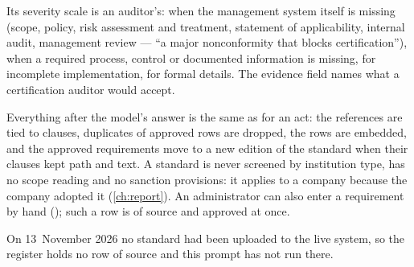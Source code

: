 Its severity scale is an auditor's:  when the management system itself is
missing (scope, policy, risk assessment and treatment, statement of applicability, internal
audit, management review --- \enquote{a major nonconformity that blocks certification}),
 when a required process, control or documented information is missing,
 for incomplete implementation,  for formal details. The evidence
field names what a certification auditor would accept.

Everything after the model's answer is the same as for an act: the references are tied to
clauses, duplicates of approved rows are dropped, the rows are embedded, and the approved
requirements move to a new edition of the standard when their clauses kept path and text. A
standard is never screened by institution type, has no scope reading and no sanction
provisions: it applies to a company because the company adopted it (\cref{ch:report}). An
administrator can also enter a requirement by hand (); such a
row is of source  and approved at once.

On 13~November 2026 no standard had been uploaded to the live system, so the register holds
no row of source  and this prompt has not run there.

